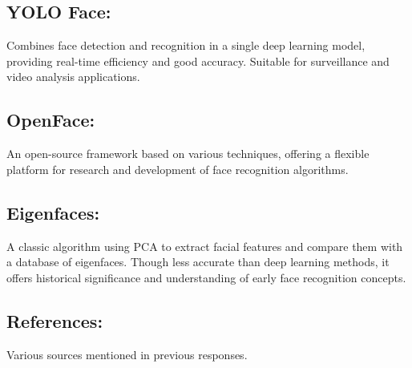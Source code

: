 \documentclass[11pt]{article}
\begin{document}
\subsection{YOLO Face:}
Combines face detection and recognition in a single deep learning model, providing real-time efficiency and good accuracy. Suitable for surveillance and video analysis applications.

\subsection{OpenFace:}
An open-source framework based on various techniques, offering a flexible platform for research and development of face recognition algorithms.

\subsection{Eigenfaces:}
A classic algorithm using PCA to extract facial features and compare them with a database of eigenfaces. Though less accurate than deep learning methods, it offers historical significance and understanding of early face recognition concepts.

\subsection{References:}
Various sources mentioned in previous responses.
\end{document}
